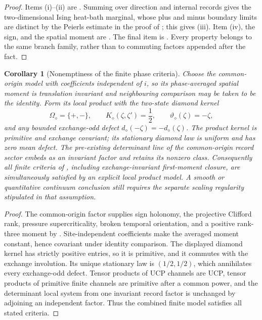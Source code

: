 \documentclass[11pt]{article}
\newtheorem{corollary}[theorem]{Corollary}
\theoremstyle{definition}
\theoremstyle{remark}
\begin{document}
\begin{proof}
Items (i)--(ii) are .
Summing over direction and internal records gives the two-dimensional Ising
heat-bath marginal, whose plus and minus boundary limits are distinct by the
Peierls estimate in the proof of ; this gives
(iii).  Item (iv), the sign, and the spatial moment are
.  The final item is
.  Every property belongs to the same branch
family, rather than to commuting factors appended after the fact.
\end{proof}

\begin{corollary}[Nonemptiness of the finite phase criteria]
\label{cor:full-phase-nonempty}
Choose the common-origin model with coefficients independent of $i$, so its
phase-averaged spatial moment is translation invariant and neighbouring
comparison may be taken to be the identity.  Form its local product with the
two-state diamond kernel
\[
 \Omega_{\diamond}=\{+,-\},\qquad
 K_{\diamond}(\zeta,\zeta')=\frac12,
 \qquad \vartheta_{\diamond}(\zeta)=-\zeta,
\]
and any bounded exchange-odd defect
$d_{\diamond}(-\zeta)=-d_{\diamond}(\zeta)$.  The product kernel is primitive and
exchange covariant; its stationary diamond law is uniform and has zero mean
defect.  The pre-existing determinant line of the common-origin record sector
embeds as an invariant factor and retains its nonzero class.  Consequently all
finite criteria of , including exchange-invariant
first-moment closure, are simultaneously satisfied by an explicit local product
model.  A smooth or quantitative continuum conclusion still requires the
separate scaling regularity stipulated in that assumption.
\end{corollary}

\begin{proof}
The common-origin factor supplies sign holonomy, the projective Clifford rank,
pressure supercriticality, broken temporal orientation, and a positive
rank-three moment by .  Site-independent
coefficients make the averaged moment constant, hence covariant under identity
comparison.  The displayed diamond kernel has strictly positive entries, so it
is primitive, and it commutes with the exchange involution.  Its unique
stationary law is $(1/2,1/2)$, which annihilates every exchange-odd defect.
Tensor products of UCP channels are UCP, tensor products of primitive finite
channels are primitive after a common power, and the determinant local system
from one invariant record factor is unchanged by adjoining an independent
factor.  Thus the combined finite model satisfies all stated criteria.
\end{proof}
\end{document}
